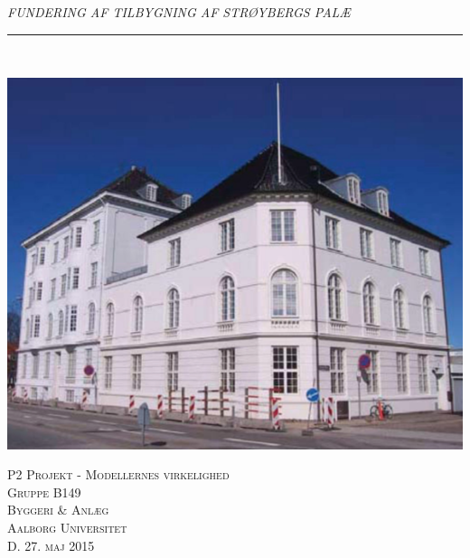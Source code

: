 \thispagestyle{empty}
\begin{flushright}
\vspace{3cm}

\phantom{hul}

\phantom{hul}

\phantom{hul}

\textsl{\Huge FUNDERING AF TILBYGNING AF STRØYBERGS PALÆ} \\ \vspace{1cm}

\rule{13cm}{3mm} \\ \vspace{1.5cm}
\vspace{1cm}

\includegraphics[width=1.0\textwidth]{billeder/forside.png}

\vspace{2cm} 
\textsc{\Large P2 Projekt - Modellernes virkelighed \\
Gruppe B149 \\
Byggeri \& Anlæg\\
Aalborg Universitet\\
D. 27. maj 2015\\}
\end{flushright}

